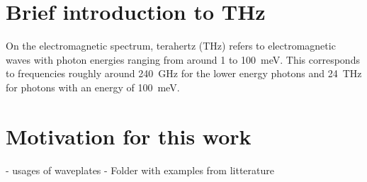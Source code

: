 \section{Brief introduction to THz}
On the electromagnetic spectrum, terahertz (THz) refers to electromagnetic waves with photon energies ranging from around 1 to \SI{100}{\milli \electronvolt}. This corresponds to frequencies roughly around \SI{240}{\giga \hertz} for the lower energy photons and \SI{24}{\tera \hertz} for photons with an energy of \SI{100}{\milli \electronvolt}.


\section{Motivation for this work}
- usages of waveplates
- Folder with examples from litterature
